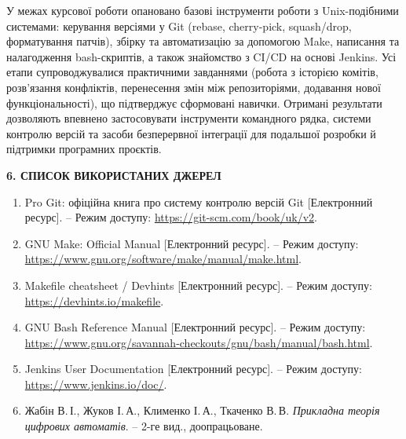 \documentclass[a4paper,12pt]{article}
\begin{document}
  У межах курсової роботи опановано базові інструменти роботи з Unix-подібними системами:
керування версіями у Git (rebase, cherry-pick, squash/drop, форматування патчів), збірку та
автоматизацію за допомогою Make, написання та налагодження bash-скриптів, а також
знайомство з CI/CD на основі Jenkins. Усі етапи супроводжувалися практичними завданнями
(робота з історією комітів, розв’язання конфліктів, перенесення змін між репозиторіями,
додавання нової функціональності), що підтверджує сформовані навички. Отримані результати
дозволяють впевнено застосовувати інструменти командного рядка, системи контролю версій та
засоби безперервної інтеграції для подальшої розробки й підтримки програмних проєктів.

  \newpage

  \begin{center}
    \label{sec:sources}%
    \textbf{\Large 6. СПИСОК ВИКОРИСТАНИХ ДЖЕРЕЛ}
  \end{center}

  \begin{enumerate}
  \item Pro Git: офіційна книга про систему контролю версій Git 
        [Електронний ресурс]. – Режим доступу: 
        \url{https://git-scm.com/book/uk/v2}.

  \item GNU Make: Official Manual [Електронний ресурс]. – Режим доступу: 
        \url{https://www.gnu.org/software/make/manual/make.html}.

  \item Makefile cheatsheet / Devhints [Електронний ресурс]. – Режим доступу: 
        \url{https://devhints.io/makefile}.

  \item GNU Bash Reference Manual [Електронний ресурс]. – Режим доступу: 
        \url{https://www.gnu.org/savannah-checkouts/gnu/bash/manual/bash.html}.

  \item Jenkins User Documentation [Електронний ресурс]. – Режим доступу: 
        \url{https://www.jenkins.io/doc/}.

  \item Жабін В.\,І., Жуков І.\,А., Клименко І.\,А., Ткаченко В.\,В. 
        \textit{Прикладна теорія цифрових автоматів}. – 2-ге вид., доопрацьоване.
\end{enumerate}
\end{document}
